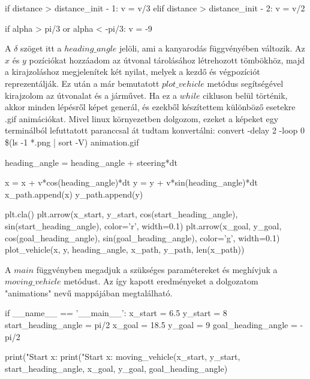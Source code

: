 \begin{python}
        if distance > distance_init - 1:
            v = v/3
        elif distance > distance_init - 2:
            v = v/2

        if alpha > pi/3 or alpha < -pi/3:
            v = -9
\end{python}

\bigskip

A $ \delta $ szöget itt a $ heading\_angle $ jelöli, ami a kanyarodás függvényében változik. Az $ x $ és $ y $ pozíciókat  hozzáadom az útvonal tárolásához létrehozott tömbökhöz, majd a kirajzoláshoz megjelenítek két nyilat, melyek a kezdő és végpozíciót reprezentálják. Ez után a már bemutatott $ plot\_vehicle $ metódus segítségével kirajzolom az útvonalat és a járművet. Ha ez a $ while $ cikluson belül történik, akkor minden lépésről képet generál, és ezekből készítettem különböző esetekre .gif animációkat. Mivel linux környezetben dolgozom, ezeket a képeket egy terminálból lefuttatott paranccsal át tudtam konvertálni: convert -delay 2 -loop 0 \$(ls -1 *.png | sort -V) animation.gif

\begin{python}
 	heading_angle = heading_angle + steering*dt

        x = x + v*cos(heading_angle)*dt
        y = y + v*sin(heading_angle)*dt
        x_path.append(x)
        y_path.append(y)

        plt.cla()
        plt.arrow(x_start, y_start, cos(start_heading_angle),
                  sin(start_heading_angle), color='r', width=0.1)
        plt.arrow(x_goal, y_goal, cos(goal_heading_angle),
                  sin(goal_heading_angle), color='g', width=0.1)
        plot_vehicle(x, y, heading_angle, x_path, y_path, len(x_path))
\end{python}

A $ main $ függvényben megadjuk a szükséges paramétereket és meghívjuk a \\ $ moving\_vehicle $ metódust. Az így kapott eredményeket a dolgozatom "animations" nevű mappájában megtalálható.

\begin{python}
if __name__ == '__main__':
    x_start = 6.5
    y_start = 8
    start_heading_angle = pi/2
    x_goal = 18.5
    y_goal = 9
    goal_heading_angle = -pi/2

    print("Start x: %
    print("Start x: %
    moving_vehicle(x_start, y_start, start_heading_angle, x_goal,
     y_goal, goal_heading_angle)
\end{python}

